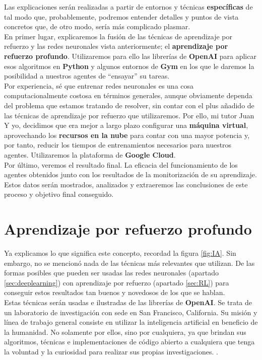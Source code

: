\documentclass[11pt,fleqn]{book} %
\begin{document}
Las explicaciones serán realizadas a partir de entornos y técnicas \textbf{específicas} de tal modo que, probablemente, podremos entender detalles y puntos de vista concretos que, de otro modo, sería más complicado plasmar. \\

En primer lugar, explicaremos la fusión de las técnicas de aprendizaje por refuerzo y las redes neuronales vista anteriormente; el \textbf{aprendizaje por refuerzo profundo}. Utilizaremos para ello las librerías de \textbf{OpenAI} para aplicar esos algoritmos en \textbf{Python} y algunos entornos de \textbf{Gym} en los que le daremos la posibilidad a nuestros agentes de ``ensayar'' su tareas. \\

Por experiencia, sé que entrenar redes neuronales es una cosa computacionalmente costosa en términos generales, aunque obviamente dependa del problema que estamos tratando de resolver, sin contar con el plus añadido de las técnicas de aprendizaje por refuerzo que utilizaremos. Por ello, mi tutor Juan Y yo, decidimos que era mejor a largo plazo configurar una \textbf{máquina virtual}, aprovechando los \textbf{recursos en la nube} para contar con una mayor potencia y, por tanto, reducir los tiempos de entrenamientos necesarios para nuestros agentes. Utilizaremos la plataforma de \textbf{Google Cloud}. \\

Por último, veremos el resultado final. La eficacia del funcionamiento de los agentes obtenidos junto con los resultados de la monitorización de su aprendizaje. Estos datos serán mostrados, analizados y extraeremos las conclusiones de este proceso y objetivo final conseguido.

\chapter{Aprendizaje por refuerzo profundo}\label{sec:DRL}

Ya explicamos lo que significa este concepto, recordad la figura \ref{fig:IA}. Sin embargo, no se mencionó nada de las técnicas más relevantes que utilizan. De las formas posibles que pueden ser usadas las redes neuronales (apartado \ref{sec:deeplearning}) con aprendizaje por refuerzo (apartado \ref{sec:RL}) para conseguir estos resultados tan buenos y novedosos de los que se hablan. \\

Estas técnicas serán usadas e ilustradas de las librerías de \textbf{OpenAI}. Se trata de un laboratorio de investigación con sede en San Francisco, California. Su misión y línea de trabajo general consiste en utilizar la inteligencia artificial en beneficio de la humanidad. No solamente por ellos, sino por cualquiera, ya que brindan sus algoritmos, técnicas e implementaciones de código abierto a cualquiera que tenga la voluntad y la curiosidad para realizar sus propias investigaciones. \cite{article:openAI}. \\
\end{document}
